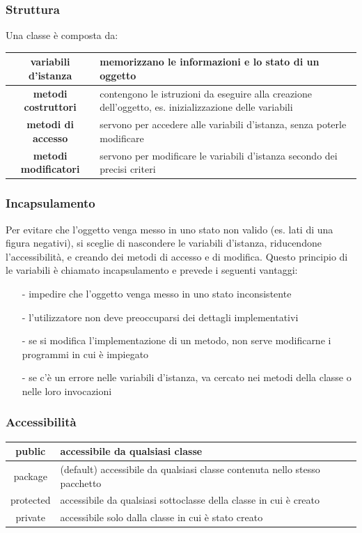 \documentclass[a4paper]{article}
\begin{document}
\subsubsection*{Struttura}
Una classe è composta da:
\begin{center}
	\begin{tabularx}{\textwidth}{c X}
		\textbf{variabili d'istanza} & memorizzano le informazioni e lo stato di un oggetto \\
		\midrule
		\textbf{metodi costruttori} & contengono le istruzioni da eseguire alla creazione dell'oggetto, es. inizializzazione delle variabili \\
		\midrule
		\textbf{metodi di accesso} & servono per accedere alle variabili d'istanza, senza poterle modificare \\
		\midrule
		\textbf{metodi modificatori} & servono per modificare le variabili d'istanza secondo dei precisi criteri
	\end{tabularx}
\end{center}

\subsubsection*{Incapsulamento}
Per evitare che l'oggetto venga messo in uno stato non valido (es. lati di una figura negativi), si sceglie di nascondere le variabili
d'istanza, riducendone l'accessibilità, e creando dei metodi di accesso e di modifica. Questo principio di  le variabili è chiamato incapsulamento e prevede i seguenti vantaggi:
\begin{itemize}[topsep=3pt, itemsep=0pt]
	\item[-] impedire che l'oggetto venga messo in uno stato inconsistente
	\item[-] l'utilizzatore non deve preoccuparsi dei dettagli implementativi
	\item[-] se si modifica l'implementazione di un metodo, non serve modificarne i programmi in cui è impiegato
	\item[-] se c'è un errore nelle variabili d'istanza, va cercato nei metodi della classe o nelle loro invocazioni
\end{itemize}

\subsubsection*{Accessibilità}
\begin{center}
	\begin{tabularx}{\textwidth}{c X}
		public & accessibile da qualsiasi classe \\
		\midrule
		package & (default) accessibile da qualsiasi classe contenuta nello stesso pacchetto \\
		\midrule
		protected & accessibile da qualsiasi sottoclasse della classe in cui è creato \\
		\midrule
		private & accessibile solo dalla classe in cui è stato creato
	\end{tabularx}
\end{center}
\end{document}
